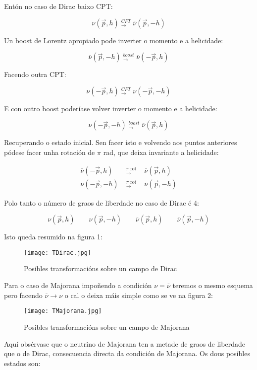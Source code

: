 \documentclass[a4paper,10pt]{article}
\newcommand{\beq}{\begin{equation}}
\newcommand{\eeq}{\end{equation}}
\newcommand{\bea}{\begin{eqnarray}}
\newcommand{\eea}{\end{eqnarray}}
\newcommand{\barra}[1]{\overline{#1}}
\newcommand{\rvec}[1]{\overrightarrow{#1}}
\begin{document}
Entón no caso de Dirac baixo CPT:

\beq
\nu (\rvec p , h) \; ^{CPT}_{\longrightarrow} \; \barra\nu ( \rvec p , -h) 
\eeq

Un boost de Lorentz apropiado pode inverter o momento e a helicidade:

\beq
\barra\nu (\rvec p , -h) \; ^{boost}_{\longrightarrow} \; \barra\nu ( -\rvec p , h) 
\eeq

Facendo outra CPT:

\beq
\nu (-\rvec p , h) \; ^{CPT}_{\longrightarrow} \; \nu ( -\rvec p , -h) 
\eeq

E con outro boost poderíase volver inverter o momento e a helicidade:

\beq
\nu (-\rvec p , -h) \; ^{boost}_{\longrightarrow} \; \barra\nu ( \rvec p , h) 
\eeq

Recuperando o estado inicial. Sen facer isto e volvendo aos puntos anteriores pódese facer unha rotación de $\pi$ rad, que deixa invariante a helicidade:

\bea
\barra\nu (-\rvec p , h) \; &^{\pi \;\text{rot}}_{\longrightarrow}& \; \barra\nu ( \rvec p , h) \\
\nu (-\rvec p , -h) \; &^{\pi \;\text{rot}}_{\longrightarrow}& \; \barra\nu ( \rvec p , -h)
\eea

Polo tanto o número de graos de liberdade no caso de Dirac é 4:

\beq
\nu (\rvec p , h) \qquad \nu (\rvec p , -h) \qquad \barra\nu (\rvec p , h) \qquad \barra\nu (\rvec p , -h)
\eeq

Isto queda resumido na figura 1:

\begin{figure}[h!]
	\centering
		\texttt{[image: TDirac.jpg]}
	\caption{ Posibles transformacións sobre un campo de Dirac}
\end{figure}

Para o caso de Majorana impoñendo a condición $\nu = \barra\nu$ teremos o mesmo esquema pero facendo $\barra\nu \rightarrow \nu$ o cal o deixa máis simple como se ve na figura 2: 

\begin{figure}[h!]
	\centering
		\texttt{[image: TMajorana.jpg]}
	\caption{ Posibles transformacións sobre un campo de Majorana}
\end{figure}

Aquí obsérvase que o neutrino de Majorana ten a metade de graos de liberdade que o de Dirac, consecuencia directa da condición de Majorana. Os dous posibles estados son:
\end{document}
